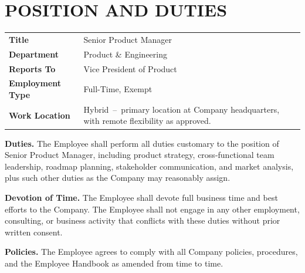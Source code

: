 \section{POSITION AND DUTIES}

\noindent
\begin{tabularx}{\linewidth}{@{}>{\color{accent}\bfseries}l@{\hspace{7mm}}V@{}}
Title           & Senior Product Manager \\[3pt]
Department      & Product \& Engineering \\[3pt]
Reports To      & Vice President of Product \\[3pt]
Employment Type & Full-Time, Exempt \\[3pt]
Work Location   & Hybrid\ --\ primary location at Company headquarters, with remote flexibility as approved.
\end{tabularx}

\parsp
\textbf{Duties.} The Employee shall perform all duties customary to the position of Senior Product Manager, including product strategy, cross-functional team leadership, roadmap planning, stakeholder communication, and market analysis, plus such other duties as the Company may reasonably assign.

\parsp
\textbf{Devotion of Time.} The Employee shall devote full business time and best efforts to the Company. The Employee shall not engage in any other employment, consulting, or business activity that conflicts with these duties without prior written consent.

\parsp
\textbf{Policies.} The Employee agrees to comply with all Company policies, procedures, and the Employee Handbook as amended from time to time.

